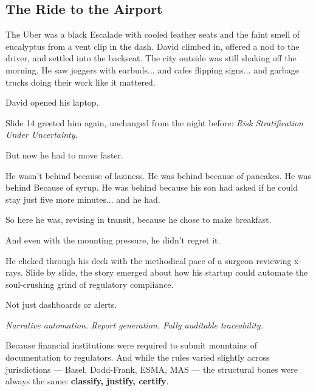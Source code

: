 
\subsection{The Ride to the Airport}

The Uber was a black Escalade with cooled leather seats and the faint smell of eucalyptus from a vent 
clip in the dash. 
David climbed in, offered a nod to the driver, and settled into the backseat. 
The city outside was still shaking off the morning. 
He saw joggers with earbuds... and cafes flipping signs... and garbage 
trucks doing their work like it mattered.

David opened his laptop.

Slide 14 greeted him again, unchanged from the night before:
\textit{Risk Stratification Under Uncertainty.}

But now he had to move faster.

He wasn’t behind because of laziness. 
He was behind because of pancakes. 
He was behind Because of syrup. 
He was behind because his son had asked if he could stay just five more minutes... and he had.

So here he was, revising in transit, because he chose to make breakfast.

And even with the mounting pressure, he didn’t regret it.

He clicked through his deck with the methodical pace of a surgeon reviewing x-rays. 
Slide by slide, the story emerged about how his startup could automate the soul-crushing grind of 
regulatory compliance.

Not just dashboards or alerts.

\textit{Narrative automation. Report generation. Fully auditable traceability.}

Because financial institutions were required to submit mountains of documentation to regulators. 
And while the rules varied slightly across jurisdictions — Basel, Dodd-Frank, ESMA, MAS — 
the structural bones were always the same: \textbf{classify, justify, certify}.

\medskip

